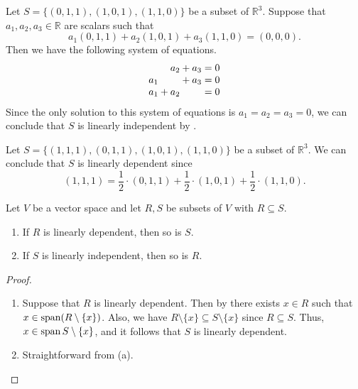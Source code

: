 \begin{example}
  Let $S = \{(0, 1, 1), (1, 0, 1), (1, 1, 0)\}$ be a subset of $\mathbb{R}^3$.
  Suppose that $a_1, a_2, a_3 \in \mathbb{R}$ are scalars such that
  \begin{equation*}
    a_1(0, 1, 1) + a_2(1, 0, 1) + a_3(1, 1, 0) = (0, 0, 0).
  \end{equation*}
  Then we have the following system of equations.
  \begin{equation*}
    \setlength\arraycolsep{0pt}
    \begin{array}{r>{{}}c<{{}}r>{{}}c<{{}}r@{{}={}}r}
          & & a_2 &+& a_3 & 0 \\
      a_1 & &     &+& a_3 & 0 \\
      a_1 &+& a_2 & &     & 0 \\
    \end{array}
  \end{equation*}
  Since the only solution to this system of equations is $a_1 = a_2 = a_3 = 0$,
  we can conclude that $S$ is linearly independent by
  .
\end{example}

\begin{example}
  Let $S = \{(1, 1, 1), (0, 1, 1), (1, 0, 1), (1, 1, 0)\}$ be a subset of
  $\mathbb{R}^3$.
  We can conclude that $S$ is linearly dependent since
  \begin{equation*}
    (1, 1, 1)
    = \frac{1}{2} \cdot (0, 1, 1) + \frac{1}{2} \cdot (1, 0, 1)
      + \frac{1}{2} \cdot (1, 1, 0).
  \end{equation*}
\end{example}

\begin{proposition}\label{prop:linear-independence-subset}
  Let $V$ be a vector space and let $R, S$ be subsets of $V$ with
  $R \subseteq S$.
  \begin{enumerate}
    \item If $R$ is linearly dependent, then so is $S$.
    \item If $S$ is linearly independent, then so is $R$.
  \end{enumerate}
\end{proposition}
\begin{proof}
  \leavevmode
  \begin{enumerate}
    \item Suppose that $R$ is linearly dependent. Then by
       there exists $x \in R$
      such that $x \in \operatorname{span}(R \setminus \{x\})$. Also, we have
      $R \setminus \{x\} \subseteq S \setminus \{x\}$ since $R \subseteq S$.
      Thus, $x \in \operatorname{span}{S \setminus \{x\}}$, and it follows that $S$ is
      linearly dependent.
    \item Straightforward from (a). \qedhere
  \end{enumerate}
\end{proof}

